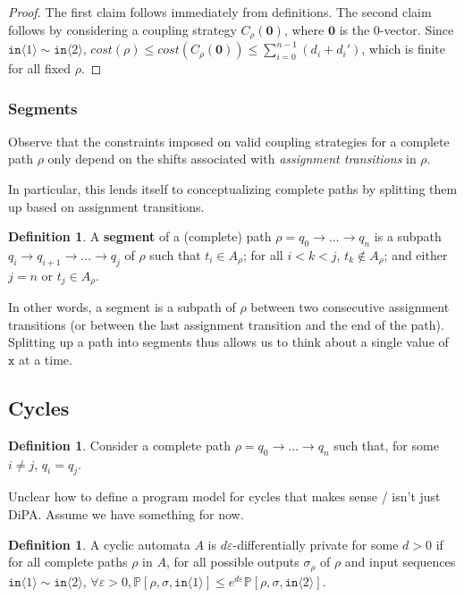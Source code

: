 \documentclass[12pt]{article}
\newcommand{\PP}{\mathbb{P}}
\newcommand{\brangle}[1]{\langle #1 \rangle}
\theoremstyle{definition}
\newtheorem{defn}[thm]{Definition}
\begin{document}
\begin{proof}
    The first claim follows immediately from definitions. The second claim follows by considering a coupling strategy $C_\rho(\bm{0})$, where $\bm{0}$ is the 0-vector. Since $\texttt{in}\brangle{1}\sim\texttt{in}\brangle{2}$, $cost(\rho)\leq cost(C_\rho(\bm{0}))\leq \sum_{i=0}^{n-1}(d_i+d_i')$, which is finite for all fixed $\rho$. 
\end{proof}

\subsubsection{Segments}

Observe that the constraints imposed on valid coupling strategies for a complete path $\rho$ only depend on the shifts associated with \textit{assignment transitions} in $\rho$. 

In particular, this lends itself to conceptualizing complete paths by splitting them up based on assignment transitions. 

\begin{defn}
    A \textbf{segment} of a (complete) path $\rho = q_0\to\ldots\to q_n$ is a subpath $q_i \to q_{i+1}\to \ldots \to q_j$ of $\rho$ such that $t_i \in A_\rho$; for all $i<k<j$, $t_k \notin A_\rho$; and either $j=n$ or $t_j \in A_\rho$.
\end{defn}

In other words, a segment is a subpath of $\rho$ between two consecutive assignment transitions (or between the last assignment transition and the end of the path). Splitting up a path into segments thus allows us to think about a single value of $\texttt{x}$ at a time. 

\subsection{Cycles}

\begin{defn}
    Consider a complete path $\rho = q_0\to\ldots \to q_n$ such that, for some $i\neq j$, $q_i = q_j$. 
\end{defn}

{\color{red} Unclear how to define a program model for cycles that makes sense / isn't just DiPA. Assume we have something for now.}

\begin{defn}
    A cyclic automata $A$ is $d\varepsilon$-differentially private for some $d>0$ if for all complete paths $\rho$ in $A$, for all possible outputs $\sigma_\rho$ of $\rho$ and input sequences $\texttt{in}\brangle{1}\sim \texttt{in}\brangle{2}$, $\forall \varepsilon>0, \PP[\rho, \sigma, \texttt{in}\brangle{1}]\leq e^{d\varepsilon}\PP[\rho, \sigma, \texttt{in}\brangle{2}]$.
\end{defn}
\end{document}
